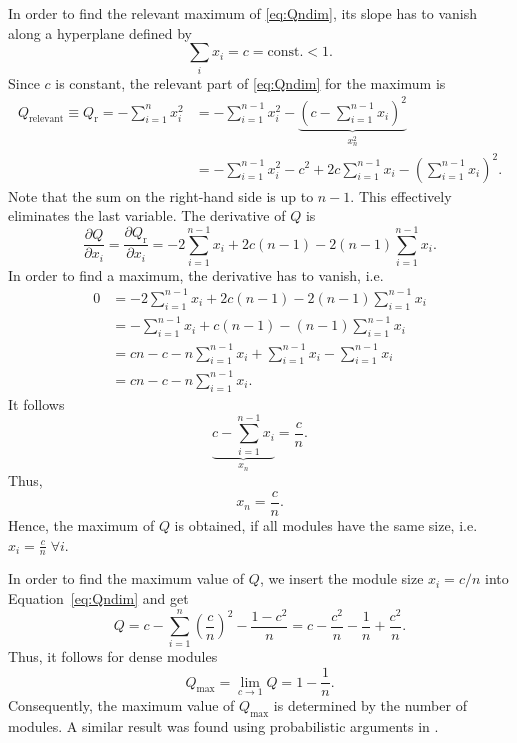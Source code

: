 In order to find the relevant maximum of \eqref{eq:Qndim}, its slope has to vanish along a hyperplane defined by
\begin{equation}\label{qmehrdimbedingung}
\sum _i x_i = c = \text{const.} <1.
\end{equation}
%
Since $c$ is constant, the relevant part of \eqref{eq:Qndim} for the maximum is
\begin{align}
Q_{\text{relevant}}\equiv Q_\text{r}= -\sum _{i=1}^n x_i^2&=-\sum _{i=1}^{n-1} x_i^2- \underbrace{ \left( 
c-\sum _{i=1}^{n-1} x_i \right) ^2 }_{x_n^2} \label{eq:relevant_Q}\\
&= -\sum _{i=1}^{n-1} x_i^2 - c^2 + 2c\sum _{i=1}^{n-1} x_i -\left( \sum _{i=1}^{n-1} x_i \right) ^2. \nonumber
\end{align}
Note that the sum on the right-hand side is up to $n-1$.
This effectively eliminates the last variable.
The derivative of $Q$ is
\begin{equation}
\frac{\partial Q}{\partial x_i}= \frac{\partial Q_\text{r}}{\partial x_i}=- 2\sum _{i=1}^{n-1} x_i + 2c(n-1)-2 (n-1) \sum _{i=1}^{n-1} x_i.
\end{equation}
%
In order to find a maximum, the derivative has to vanish, i.e.
\begin{align*}
0&=- 2\sum _{i=1}^{n-1} x_i + 2c(n-1)-2 (n-1) \sum _{i=1}^{n-1} x_i \\
&=- \sum _{i=1}^{n-1} x_i + c(n-1) - (n-1) \sum _{i=1}^{n-1} x_i \\
 &= cn-c-n\sum _{i=1}^{n-1} x_i +\sum _{i=1}^{n-1} x_i -\sum _{i=1}^{n-1} x_i\\
 &= cn-c-n\sum _{i=1}^{n-1} x_i .
\end{align*}
It follows
\[
\underbrace{c-\sum _{i=1}^{n-1} x_i}_{x_n} =\frac{c}{n}.
\]
Thus,
\begin{equation}
x_n=\frac{c}{n}.
\end{equation}
Hence, the maximum of $Q$ is obtained, if all modules have the same size, i.e. $x_i=\frac{c}{n} \; \forall i$.

In order to find the maximum value of $Q$, we insert the module size $x_i=c/n$ into Equation~\eqref{eq:Qndim} and get
\[
Q=c-\sum _{i=1} ^n \left( \frac{c}{n} \right) ^2 - \frac{1-c^2}{n}=c-\frac{c^2}{n}-\frac{1}{n}+\frac{c^2}{n}.
\]
Thus, it follows for dense modules
\begin{equation}\label{eq:q_max}
Q_\mathrm{max}= \lim _{c\rightarrow 1}Q=1-\frac{1}{n}.
\end{equation}
Consequently, the maximum value of $Q_\mathrm{max}$ is determined by the number of modules.
A similar result was found using probabilistic arguments in \citep{Good2010}.

